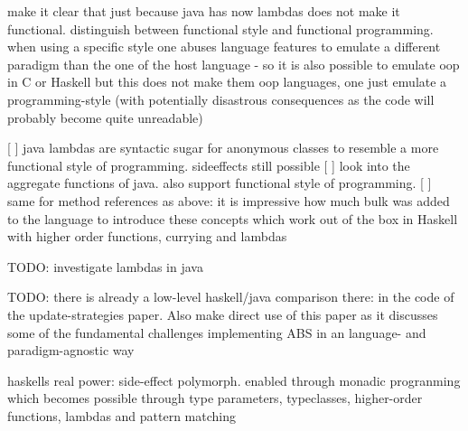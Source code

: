 make it clear that just because java has now lambdas does not make it functional. 
distinguish between functional style and functional programming. when using a specific style one abuses language features to emulate a different paradigm than the one of the host language - so it is also possible to emulate oop in C or Haskell but this does not make them oop languages, one just emulate a programming-style (with potentially disastrous consequences as the code will probably become quite unreadable)

[ ] java lambdas are syntactic sugar for anonymous classes to resemble a more functional style of programming. sideeffects still possible
[ ] look into the aggregate functions of java. also support functional style of programming.
[ ] same for method references as above: it is impressive how much bulk was added to the language to introduce these concepts which work out of the box in Haskell with higher order functions, currying and lambdas 

TODO: investigate lambdas in java

TODO: there is already a low-level haskell/java comparison there: in the code of the update-strategies paper. Also make direct use of this paper as it discusses some of the fundamental challenges implementing ABS in an language- and paradigm-agnostic way

haskells real power: side-effect polymorph. enabled through monadic progranming which becomes possible through type parameters, typeclasses, higher-order functions, lambdas and pattern matching